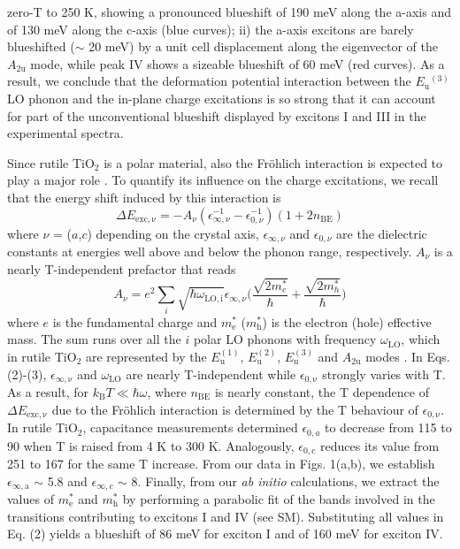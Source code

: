 \documentclass[aps,prl,twocolumn,amsfonts,nobibnotes,superscriptaddress,showpacs]{revtex4-1}
\begin{document}
zero-T to 250 K, showing a pronounced blueshift of 190 meV along the a-axis and of 130 meV along the c-axis (blue curves); ii) the a-axis excitons are barely blueshifted ($\sim$ 20 meV) by a unit cell displacement along the eigenvector of the $A\mathrm{_{2u}}$ mode, while peak IV shows a sizeable blueshift of 60 meV (red curves). As a result, we conclude that the deformation potential interaction between the $E\mathrm{_{u}}^{(3)}$ LO phonon and the in-plane charge excitations is so strong that it can account for part of the unconventional blueshift displayed by excitons I and III in the experimental spectra.

Since rutile TiO$_2$ is a polar material, also the Fr\"ohlich interaction is expected to play a major role \cite{frohlich1950xx}. To quantify its influence on the charge excitations, we recall that the energy shift induced by this interaction is \cite{frohlich1950xx, fan}
\begin{equation}
\Delta E\mathrm{_{exc,\nu}} = -A_{\nu}(\epsilon_{\infty,\nu}^{-1} - \epsilon_{0,\nu}^{-1})(1+2n\mathrm{_{BE}})
\end{equation}
\noindent where $\nu$ = ($a$,$c$) depending on the crystal axis, $\epsilon_{\infty,\nu}$ and $\epsilon_{0, \nu}$ are the dielectric constants at energies well above and below the phonon range, respectively. $A_{\nu}$ is a nearly T-independent prefactor that reads
\begin{equation}
A_{\nu} = e^2 \sum_i \sqrt{\hbar \omega\mathrm{_{LO, i}}} \epsilon_{\infty,\nu} \Bigg(\frac{\sqrt{2m_e^*}}{\hbar} + \frac{\sqrt{2m_h^*}}{\hbar}\Bigg)
\end{equation}
where $e$ is the fundamental charge and $m\mathrm{_e^*}$ ($m\mathrm{_h^*}$) is the electron (hole) effective mass. The sum runs over all the $i$ polar LO phonons with frequency $\omega_\mathrm{{LO}}$, which in rutile TiO$_2$ are represented by the $E\mathrm{_u^{(1)}}$, $E\mathrm{_u^{(2)}}$, $E\mathrm{_u^{(3)}}$ and $A\mathrm{_{2u}}$ modes \cite{traylor1971lattice}. In Eqs. (2)-(3), $\epsilon_\mathrm{{\infty,\nu}}$ and $\omega\mathrm{_{LO}}$ are nearly T-independent while $\epsilon\mathrm{_{0,\nu}}$ strongly varies with T. As a result, for $k\mathrm{_B} T \ll \hbar\omega$, where $n\mathrm{_{BE}}$ is nearly constant, the T dependence of $\Delta E\mathrm{_{exc,\nu}}$ due to the Fr\"ohlich interaction is determined by the T behaviour of $\epsilon\mathrm{_{0, \nu}}$. In rutile TiO$_2$, capacitance measurements \cite{samara1973pressure} determined $\epsilon_{0, a}$ to decrease from 115 to 90 when T is raised from 4 K to 300 K. Analogously, $\epsilon\mathrm{_{0, c}}$ reduces its value from 251 to 167 for the same T increase. From our data in Figs. 1(a,b), we establish $\epsilon\mathrm{_{\infty,a}}$ $\sim$ 5.8 and $\epsilon_{\infty,c}$ $\sim$ 8. Finally, from our \textit{ab initio} calculations, we extract the values of $m\mathrm{_e^*}$ and $m\mathrm{_h^*}$ by performing a parabolic fit of the bands involved in the transitions contributing to excitons I and IV (see SM). Substituting all values in Eq. (2) yields a blueshift of 86 meV for exciton I and of 160 meV for exciton IV.
\end{document}
